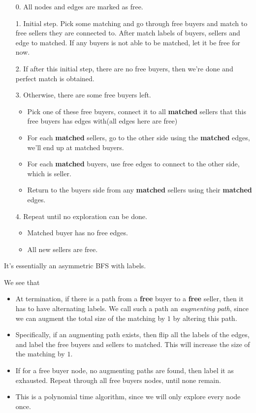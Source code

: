 \begin{enumerate}
	\item[0.] All nodes and edges are marked as free.
	\item[1.] Initial step. Pick some matching and go through free buyers and match to free sellers they are connected to.
		After match labels of buyers, sellers and edge to matched. If any buyers is not able to be matched, let it be free for now.
	\item[2.] If after this initial step, there are no free buyers, then we're done and perfect match is obtained.
	\item[3.] Otherwise, there are some free buyers left.
		\begin{itemize}
			\item Pick one of these free buyers, connect it to all \textbf{matched} sellers that this free buyers has edges with(all edges here are free)
			\item For each \textbf{matched} sellers, go to the other side using the \textbf{matched} edges, we'll end up at matched buyers.
			\item For each \textbf{matched} buyers, use free edges to connect to the other side, which is seller.
			\item Return to the buyers side from any \textbf{matched} sellers using their \textbf{matched} edges.
		\end{itemize}
	\item[4.] Repeat until no exploration can be done.
		\begin{itemize}
			\item Matched buyer has no free edges.
			\item All new sellers are free.
		\end{itemize}
\end{enumerate}

\begin{intuition}
	It's essentially an asymmetric BFS with labels.
\end{intuition}

\begin{remark}
	We see that
	\begin{itemize}
		\item At termination, if there is a path from a \textbf{free} buyer to a \textbf{free} seller, then it has to have alternating labels. We
		      call such a path an \emph{augmenting path}, since we can augment the total size of the matching by \(1\) by altering this path.
		\item Specifically, if an augmenting path exists, then flip all the labels of the edges, and label the free buyers and sellers to matched. This
		      will increase the size of the matching by \(1\).
		\item If for a free buyer node, no augmenting paths are found, then label it as exhausted. Repeat through all free buyers nodes, until none remain.
		\item This is a polynomial time algorithm, since we will only explore every node once.
	\end{itemize}
\end{remark}

